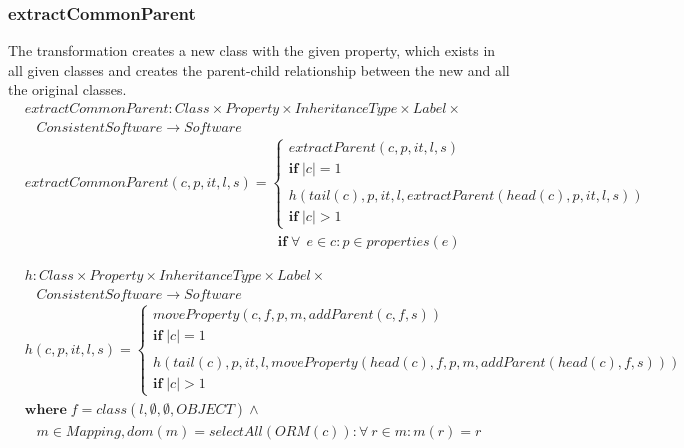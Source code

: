 \documentclass[10pt]{article}
\begin{document}
\subsubsection{extractCommonParent}
The transformation creates a new class with the given property, which exists in all given classes and creates the parent-child relationship between the new and all the original classes.
\begin{align}
& extractCommonParent: Class \times Property \times InheritanceType \times Label \times
\nonumber \\
& \;\;\; ConsistentSoftware \rightarrow Software \\
& extractCommonParent(c, p, it, l, s) = \begin{cases}
     extractParent(c, p, it, l, s) \\
     \mathbf{if} \; |c| = 1 \\\\
     h(tail(c), p, it, l, extractParent(head(c), p, it, l, s)) \\
       \mathbf{if} \; |c| > 1
 \end{cases} \\
& \;\;\;\;\;\;\;\;\;\;\;\;\;\;\;\;\;\;\;\;\;\;\;\;\;\;\;\;\;\;\;\;\;\;\;\;\;\;\;\;\;\;\;\;\;\;\;\;\;\;\;\;\;\;\;\;\;\;\;\;\;\;\;\;\; \mathbf{if} \; \forall \: \: e \in c : p \in properties(e)
\end{align}

\begin{align}
& h: Class \times Property \times InheritanceType \times Label \times
\nonumber \\
& \;\;\; ConsistentSoftware \rightarrow Software \\
& h(c, p, it, l, s) = \begin{cases}
    moveProperty(c, f, p, m, addParent(c, f, s)) \\
    \mathbf{if} \; |c| = 1 \\
   \\
    h(tail(c), p, it, l, moveProperty(head(c), f, p, m, addParent(head(c), f, s)))\\
    \mathbf{if} \; |c| > 1
 \end{cases} \nonumber \\
&   \mathbf{where} \; f = class(l, \emptyset, \emptyset, OBJECT) \land  \\
&    \;\;\; m \in Mapping, dom(m) = selectAll(ORM(c)) : \forall \: r \in m :  m(r) = r  \nonumber
\end{align}
\end{document}
